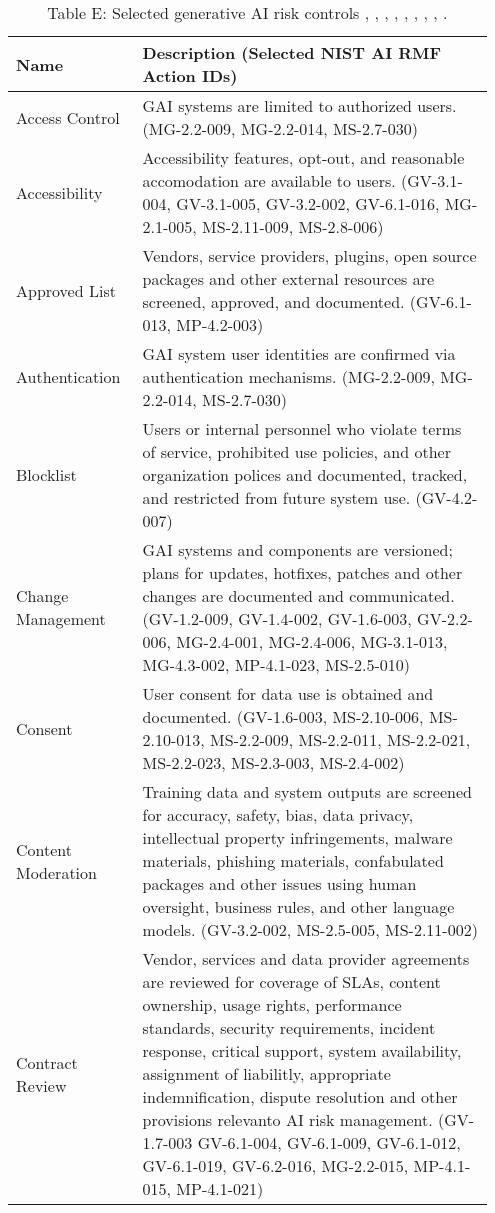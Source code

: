 \documentclass[fleqn]{article}
\begin{document}
\begin{table}[H]
	\caption*{Table E: Selected generative AI risk controls \cite{airmf}, \cite{playbook}, \cite{ai600-1}, \cite{iso42001}, \cite{mcgraw2024architectural}, \cite{mcgraw2020architectural}, \cite{msft_rai_std}, \cite{uk_ai_safety}, \cite{occ_mrm}. }
	\label{tab:controls}
	\footnotesize
	\begin{tabular}{|m{0.25\linewidth} |m{0.70\linewidth} |}
		\hline
		\textbf{Name} & \textbf{Description} (Selected NIST AI RMF Action IDs) \\
		\hline
		Access Control  & GAI systems are limited to authorized users. (MG-2.2-009, MG-2.2-014, MS-2.7-030) \\ 
		\hline
		Accessibility  & Accessibility features, opt-out, and reasonable accomodation are available to users. (GV-3.1-004, GV-3.1-005, GV-3.2-002, GV-6.1-016, MG-2.1-005, MS-2.11-009, MS-2.8-006) \\ 
		\hline
		Approved List & Vendors, service providers, plugins, open source packages and other external resources are screened, approved, and documented. (GV-6.1-013, MP-4.2-003) \\ \hline
		Authentication  & GAI system user identities are confirmed via authentication mechanisms. (MG-2.2-009, MG-2.2-014, MS-2.7-030) \\ 
		\hline
		Blocklist & Users or internal personnel who violate terms of service, prohibited use policies, and other organization polices and documented, tracked, and restricted from future system use. (GV-4.2-007) \\ \hline		
		Change Management & GAI systems and components are versioned; plans for updates, hotfixes, patches and other changes are documented and communicated. (GV-1.2-009, GV-1.4-002, GV-1.6-003, GV-2.2-006, 		MG-2.4-001, MG-2.4-006, MG-3.1-013, MG-4.3-002, MP-4.1-023, 
		MS-2.5-010)  \\ 
		\hline
		Consent & User consent for data use is obtained and documented. (GV-1.6-003, MS-2.10-006, MS-2.10-013, MS-2.2-009, MS-2.2-011, 	MS-2.2-021, MS-2.2-023, MS-2.3-003, MS-2.4-002)  \\ \hline
		Content Moderation & Training data and system outputs are screened for accuracy, safety, bias, data privacy, intellectual property infringements, malware materials, phishing materials, confabulated packages and other issues using human oversight, business rules, and other language models. (GV-3.2-002, MS-2.5-005, MS-2.11-002)  \\ \hline
		Contract Review & Vendor, services and data provider agreements are reviewed for coverage of SLAs, content ownership, usage rights, performance standards, security requirements, incident response, critical support, system availability, assignment of liabilitly, appropriate indemnification, dispute resolution and other provisions relevanto AI risk management. (GV-1.7-003 GV-6.1-004, GV-6.1-009, GV-6.1-012, GV-6.1-019, GV-6.2-016, 		MG-2.2-015, MP-4.1-015, MP-4.1-021) \\ 

\end{tabular}
\end{table}
\end{document}
